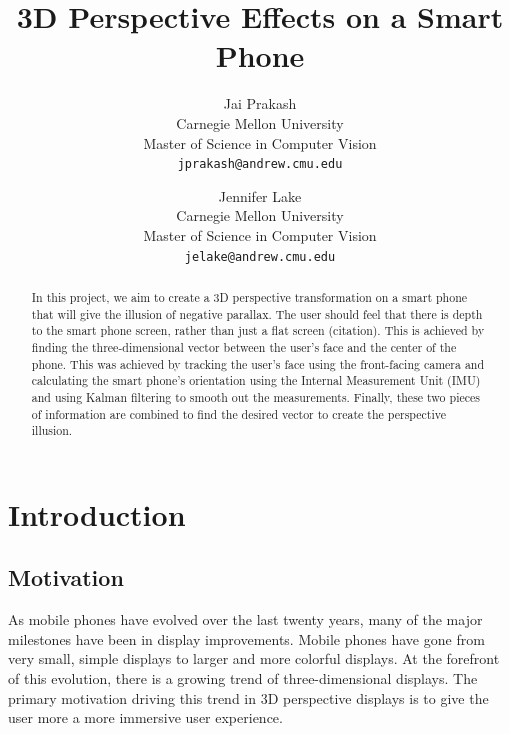 \documentclass[12pt,twocolumn,letterpaper]{article}
\begin{document}
\title{3D Perspective Effects on a Smart Phone}

\author{Jai Prakash\\
Carnegie Mellon University\\
Master of Science in Computer Vision\\
{\tt\small jprakash@andrew.cmu.edu}
\and
Jennifer Lake\\
Carnegie Mellon University\\
Master of Science in Computer Vision\\
{\tt\small jelake@andrew.cmu.edu}
}

\maketitle

\begin{abstract}
In this project, we aim to create a 3D perspective transformation on a smart phone that will give the illusion of negative parallax.  The user should feel that there is depth to the smart phone screen, rather than just a flat screen (citation).   This is achieved by finding the three-dimensional vector between the user’s face and the center of the phone.  This was achieved by tracking the user’s face using the front-facing camera and calculating the smart phone’s orientation using the Internal Measurement Unit (IMU) and using Kalman filtering to smooth out the measurements.  Finally, these two pieces of information are combined to find the desired vector to create the perspective illusion.
\end{abstract}

\section{Introduction}
\subsection{Motivation}
As mobile phones have evolved over the last twenty years, many of the major milestones have been in display improvements. Mobile phones have gone from very small, simple displays to larger and more colorful displays.  At the forefront of this evolution, there is a growing trend of three-dimensional displays.  The primary motivation driving this trend in 3D perspective displays is to give the user more a more immersive user experience.
\end{document}
